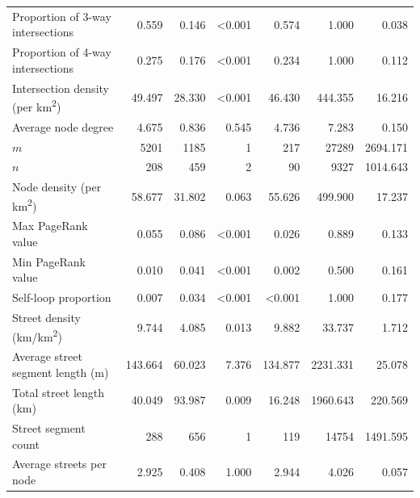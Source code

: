 \documentclass[11pt]{article}
\begin{document}
\begin{multicols}{2}
\begin{table}[htbp]
\begin{tabular}{ l r r r r r r }
	Proportion of 3-way intersections                & 0.559   & 0.146   & \textless0.001 & 0.574          & 1.000    & 0.038   \\
	Proportion of 4-way intersections                & 0.275   & 0.176   & \textless0.001 & 0.234          & 1.000    & 0.112   \\
	Intersection density (per km\textsuperscript{2}) & 49.497  & 28.330  & \textless0.001 & 46.430         & 444.355  & 16.216  \\
	Average node degree                              & 4.675   & 0.836   & 0.545          & 4.736          & 7.283    & 0.150   \\
	$m$                                              & 5201    & 1185    & 1              & 217            & 27289    & 2694.171\\
	$n$                                              & 208     & 459     & 2              & 90             & 9327     & 1014.643\\
	Node density (per km\textsuperscript{2})         & 58.677  & 31.802  & 0.063          & 55.626         & 499.900  & 17.237  \\
	Max PageRank value                               & 0.055   & 0.086   & \textless0.001 & 0.026          & 0.889    & 0.133   \\
	Min PageRank value                               & 0.010   & 0.041   & \textless0.001 & 0.002          & 0.500    & 0.161   \\
	Self-loop proportion                             & 0.007   & 0.034   & \textless0.001 & \textless0.001 & 1.000    & 0.177   \\
	Street density (km/km\textsuperscript{2})        & 9.744   & 4.085   & 0.013          & 9.882          & 33.737   & 1.712   \\
	Average street segment length (m)                & 143.664 & 60.023  & 7.376          & 134.877        & 2231.331 & 25.078  \\
	Total street length (km)                         & 40.049  & 93.987  & 0.009          & 16.248         & 1960.643 & 220.569 \\
	Street segment count                             & 288     & 656     & 1              & 119            & 14754    & 1491.595\\
	Average streets per node                         & 2.925   & 0.408   & 1.000          & 2.944          & 4.026    & 0.057   \\
	\bottomrule
\end{tabular}
\end{table}


\end{multicols}
\end{document}
